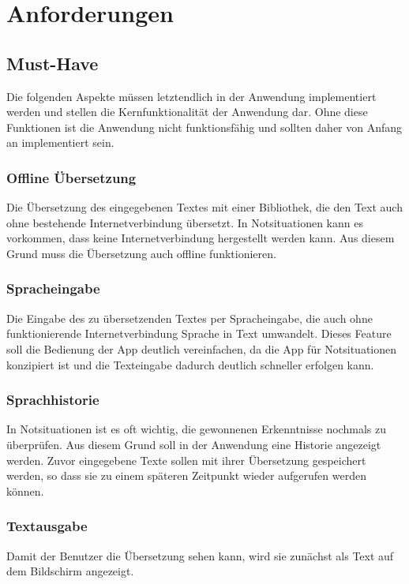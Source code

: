 \newpage
\section{Anforderungen}\label{sec:requirements}

\subsection{Must-Have}
Die folgenden Aspekte müssen letztendlich in der Anwendung implementiert werden und stellen die Kernfunktionalität der Anwendung dar. Ohne diese Funktionen ist die Anwendung nicht funktionsfähig und sollten daher von Anfang an implementiert sein. 

\subsubsection{Offline Übersetzung}
Die Übersetzung des eingegebenen Textes mit einer Bibliothek, die den Text auch ohne bestehende Internetverbindung übersetzt. In Notsituationen kann es vorkommen, dass keine Internetverbindung hergestellt werden kann. Aus diesem Grund muss die Übersetzung auch offline funktionieren.

\subsubsection{Spracheingabe}
Die Eingabe des zu übersetzenden Textes per Spracheingabe, die auch ohne funktionierende Internetverbindung Sprache in Text umwandelt. Dieses Feature soll die Bedienung der App deutlich vereinfachen, da die App für Notsituationen konzipiert ist und die Texteingabe dadurch deutlich schneller erfolgen kann. 

\subsubsection{Sprachhistorie}
In Notsituationen ist es oft wichtig, die gewonnenen Erkenntnisse nochmals zu überprüfen. Aus diesem Grund soll in der Anwendung eine Historie angezeigt werden. Zuvor eingegebene Texte sollen mit ihrer Übersetzung gespeichert werden, so dass sie zu einem späteren Zeitpunkt wieder aufgerufen werden können.

\subsubsection{Textausgabe}
Damit der Benutzer die Übersetzung sehen kann, wird sie zunächst als Text auf dem Bildschirm angezeigt.

